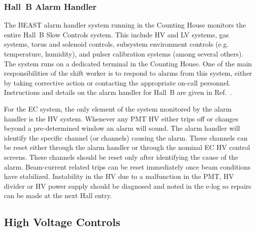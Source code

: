 \documentclass[letterpaper,10pt]{article}
\begin{document}
\subsubsection{Hall~B Alarm Handler}
\label{alarms}

The BEAST alarm handler system running in the Counting House monitors the entire Hall~B Slow Controls
system. This include HV and LV systems, gas systems, torus and solenoid controls, subsystem
environment controls (e.g. temperature, humidity), and pulser calibration systems (among several
others). The system runs on a dedicated terminal in the Counting House. One of the main responsibilities
of the shift worker is to respond to alarms from this system, either by taking corrective action
or contacting the appropriate on-call personnel. Instructions and details on the alarm handler for Hall~B
are given in Ref.~\cite{beast}.

For the EC system, the only element of the system monitored by the alarm handler is the HV system.
Whenever any PMT HV either trips off or changes beyond a pre-determined window an alarm will sound.
The alarm handler will identify the specific channel (or channels) causing the alarm. These channels can
be reset either through the alarm handler or through the nominal EC HV control screens. These channels
should be reset only after identifying the cause of the alarm.  Beam-current related trips can be reset
immediately once beam conditions have stabilized.  Instability in the HV due to a malfunction in the PMT,
HV divider or HV power supply should be diagnosed and noted in the e-log so repairs can be made at
the next Hall entry.  

\subsection{High Voltage Controls}
\label{hv-control}
\end{document}
